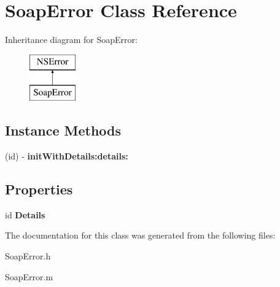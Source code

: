 \hypertarget{interface_soap_error}{}\section{Soap\+Error Class Reference}
\label{interface_soap_error}
Inheritance diagram for Soap\+Error\+:\begin{figure}[H]
\begin{center}
\leavevmode
\includegraphics[height=2.000000cm]{interface_soap_error}
\end{center}
\end{figure}
\subsection*{Instance Methods}
\begin{DoxyCompactItemize}
\item 
\hypertarget{interface_soap_error_a30b61c1aebfbe09dbfcebe794ad9ea51}{}(id) -\/ {\bfseries init\+With\+Details\+:details\+:}\label{interface_soap_error_a30b61c1aebfbe09dbfcebe794ad9ea51}

\end{DoxyCompactItemize}
\subsection*{Properties}
\begin{DoxyCompactItemize}
\item 
\hypertarget{interface_soap_error_adf9f62c79157723900a47de3c05968c3}{}id {\bfseries Details}\label{interface_soap_error_adf9f62c79157723900a47de3c05968c3}

\end{DoxyCompactItemize}


The documentation for this class was generated from the following files\+:\begin{DoxyCompactItemize}
\item 
Soap\+Error.\+h\item 
Soap\+Error.\+m\end{DoxyCompactItemize}
